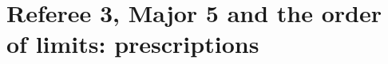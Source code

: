 \providecommand{\dref}[1]{\texttt{\detokenize{#1}}}
\section{Referee 3, Major 5 and the order of limits: prescriptions}\label{sec:ref3presc}

